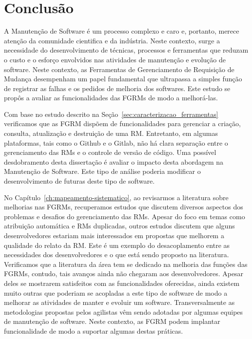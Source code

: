 \chapter{Conclusão}
\label{ch:conclusao_trab_futuros}

A Manutenção de Software é um processo complexo e caro e, portanto, merece
atenção da comunidade cientifica e da indústria. Neste contexto, surge a
necessidade do desenvolvimento de técnicas, processos e ferramentas que reduzam
o custo e o esforço envolvidos nas atividades de manutenção e evolução de
software. Neste contexto, as Ferramentas de Gerenciamento de Requisição de
Mudança desempenham um papel fundamental que ultrapassa a simples função de
registrar as falhas e os pedidos de melhoria dos softwares. Este estudo se
propôs a avaliar as funcionalidades das FGRMs de modo a melhorá-las.

Com base no estudo descrito na Seção~\ref{sec:caracterizacao_ferramentas}
verificamos que as FGRM dispõem de funcionalidades para gerenciar a criação,
consulta, atualização e destruição de uma RM\@. Entretanto, em algumas
plataformas, tais como o Github e o Gitlab, não há clara separação entre o
gerenciamento das RMs e o controle de versão de código. Uma possível
desdobramento desta dissertação é avaliar o impacto desta abordagem na
Manutenção de Software. Este tipo de análise poderia modificar o desenvolvimento
de futuras deste tipo de software.

No Capítulo~\ref{ch:mapeamento-sistematico}, ao revisarmos a literatura sobre
melhorias nas FGRMs, recuperamos estudos que discutem diversos aspectos dos
problemas e desafios do gerenciamento das RMs. Apesar do foco em temas como
atribuição automática e RMs duplicadas, outros estudos discutem que alguns
desenvolvedores estariam mais interessados em propostas que melhorem a qualidade
do relato da RM\@. Este é um exemplo do desacoplamento entre as necessidades dos
desenvolvedores e o que está sendo proposto na literatura. Verificamos que a
literatura da área tem se dedicado na melhoria das funções das FGRMs, contudo,
tais avanços ainda não chegaram aos desenvolvedores. Apesar deles se mostrarem
satisfeitos com as funcionalidades oferecidas, ainda existem muito outras que
poderiam se acopladas a este tipo de software de modo a melhorar as atividades
de manter e evoluir um software. Transversalmente as metodologias propostas
pelos agilistas vêm sendo adotadas por algumas equipes de manutenção de
software. Neste contexto, as FGRM podem implantar funcionalidade de modo a
suportar algumas destas práticas.


